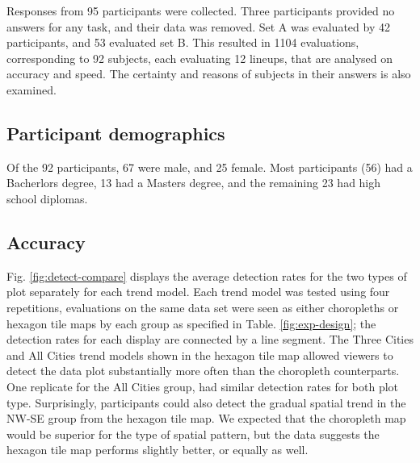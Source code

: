 \documentclass[conference,final,]{IEEEtran}
\begin{document}
Responses from 95 participants were collected. Three participants provided no answers for any task, and their data was removed. Set A was evaluated by 42 participants, and 53 evaluated set B. This resulted in 1104 evaluations, corresponding to 92 subjects, each evaluating 12 lineups, that are analysed on accuracy and speed. The certainty and reasons of subjects in their answers is also examined.

\hypertarget{participant-demographics}{%
\subsection{Participant demographics}\label{participant-demographics}}

Of the 92 participants, 67 were male, and 25 female. Most participants (56) had a Bacherlors degree, 13 had a Masters degree, and the remaining 23 had high school diplomas.

\hypertarget{accuracy}{%
\subsection{Accuracy}\label{accuracy}}

Fig. \ref{fig:detect-compare} displays the average detection rates for the two types of plot separately for each trend model. Each trend model was tested using four repetitions, evaluations on the same data set were seen as either choropleths or hexagon tile maps by each group as specified in Table. \ref{fig:exp-design}; the detection rates for each display are connected by a line segment. The Three Cities and All Cities trend models shown in the hexagon tile map allowed viewers to detect the data plot substantially more often than the choropleth counterparts. One replicate for the All Cities group, had similar detection rates for both plot type. Surprisingly, participants could also detect the gradual spatial trend in the NW-SE group from the hexagon tile map. We expected that the choropleth map would be superior for the type of spatial pattern, but the data suggests the hexagon tile map performs slightly better, or equally as well.
\end{document}
